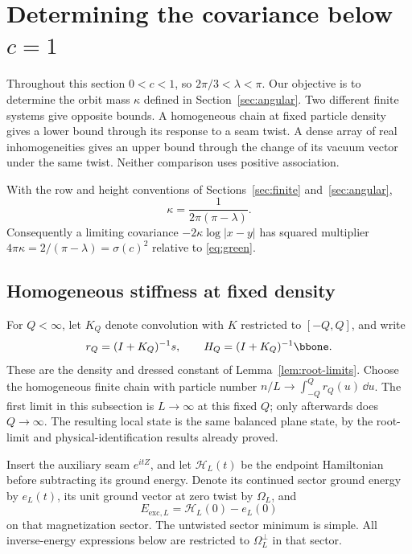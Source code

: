 \section{Determining the covariance below \texorpdfstring{\(c=1\)}{c=1}}\label{sec:normalization}

Throughout this section \(0<c<1\), so \(2\pi/3<\lambda<\pi\).
Our objective is to determine the orbit mass \(\kappa\) defined in
Section~\ref{sec:angular}. Two different finite systems give opposite
bounds. A homogeneous chain at fixed particle density gives a lower
bound through its response to a seam twist. A dense array of real
inhomogeneities gives an upper bound through the change of its vacuum
vector under the same twist. Neither comparison uses positive association.

\begin{proposition}\label{prop:normalization}
With the row and height conventions of Sections~\ref{sec:finite}
and~\ref{sec:angular},
\begin{equation}\label{eq:kappa-value}
 \kappa=\frac1{2\pi(\pi-\lambda)}.
\end{equation}
Consequently a limiting covariance \(-2\kappa\log|x-y|\) has squared
multiplier \(4\pi\kappa=2/(\pi-\lambda)=\sigma(c)^2\) relative to
\eqref{eq:green}.
\end{proposition}

\subsection{Homogeneous stiffness at fixed density}

For \(Q<\infty\), let \(K_Q\) denote convolution with \(K\) restricted to
\([-Q,Q]\), and write
\[
 r_Q=(I+K_Q)^{-1}s,\qquad H_Q=(I+K_Q)^{-1}\bbone.
\]
These are the density and dressed constant of Lemma~\ref{lem:root-limits}.
Choose the homogeneous finite chain with particle number
\(n/L\to\int_{-Q}^{Q}r_Q(u)\,\dd u\). The first limit in this subsection
is \(L\to\infty\) at this fixed \(Q\); only afterwards does \(Q\to\infty\).
The resulting local state is the same balanced plane state, by the
root-limit and physical-identification results already proved.

Insert the auxiliary seam \(e^{itZ}\), and let \(\mathcal H_L(t)\) be the
endpoint Hamiltonian before subtracting its ground energy. Denote its
continued sector ground energy by \(e_L(t)\), its unit ground vector at
zero twist by \(\Omega_L\), and
\[
 E_{\mathrm{exc},L}
   =\mathcal H_L(0)-e_L(0)
\]
on that magnetization sector. The untwisted sector minimum is simple.
All inverse-energy expressions below are restricted to
\(\Omega_L^\perp\) in that sector.


